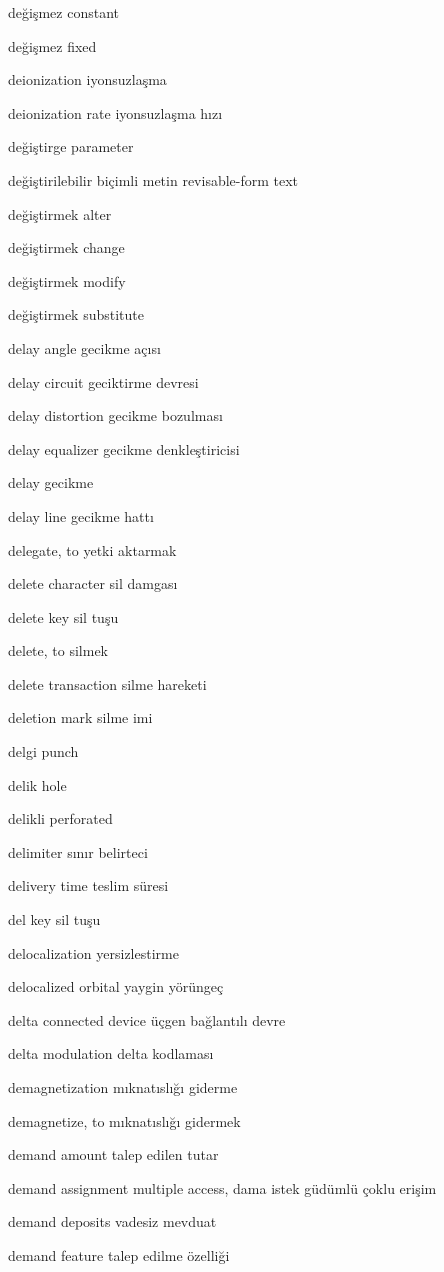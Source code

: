 \documentclass[12pt,fleqn]{article}\usepackage{../../common}
\begin{document}
değişmez constant

değişmez fixed

deionization iyonsuzlaşma

deionization rate iyonsuzlaşma hızı

değiştirge parameter

değiştirilebilir biçimli metin revisable-form text

değiştirmek alter

değiştirmek change

değiştirmek modify

değiştirmek substitute

delay angle gecikme açısı

delay circuit geciktirme devresi

delay distortion gecikme bozulması

delay equalizer gecikme denkleştiricisi

delay gecikme

delay line gecikme hattı

delegate, to yetki aktarmak

delete character sil damgası

delete key sil tuşu

delete, to silmek

delete transaction silme hareketi

deletion mark silme imi

delgi punch

delik hole

delikli perforated

delimiter sınır belirteci

delivery time teslim süresi

del key sil tuşu

delocalization yersizlestirme

delocalized orbital yaygin yörüngeç

delta connected device üçgen bağlantılı devre

delta modulation delta kodlaması

demagnetization mıknatıslığı giderme

demagnetize, to mıknatıslığı gidermek

demand amount talep edilen tutar

demand assignment multiple access, dama istek güdümlü çoklu erişim

demand deposits vadesiz mevduat

demand feature talep edilme özelliği
\end{document}
